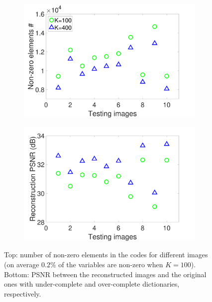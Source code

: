 \begin{figure}[h]
\centering
\begin{subfigure}{0.45\textwidth}
  \includegraphics[width=1\linewidth]{figure/nonZeroElement.pdf}
\end{subfigure}
\begin{subfigure}{0.45\textwidth}
  \includegraphics[width=1\linewidth]{figure/reconPSNR.pdf}
\end{subfigure}

\caption{Top: number of non-zero elements in the codes for different images (on average $0.2\%$ of the variables are non-zero when $K=100$). Bottom: PSNR between the reconstructed images and the original ones with under-complete and over-complete dictionaries, respectively.}
\label{fig:overVSunder}
\end{figure}

